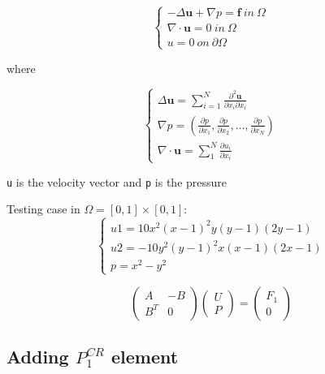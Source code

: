 \documentclass[11pt]{article}
\begin{document}
    \[
\left\{\begin{array}{l}
- \Delta\boldsymbol{u} + \nabla p = \boldsymbol{f} \ in \  \Omega \\
\nabla\cdot\boldsymbol{u} = 0 \ in \  \Omega \\
u = 0 \ on \ \partial \Omega
\end{array}\right.
\]

where

\[
\left\{\begin{array}{l}
\Delta \mathbf{u}=\sum_{i=1}^{N} \frac{\partial^{2} \mathbf{u}}{\partial x_{i} \partial x_{i}} \\
\nabla p=\left(\frac{\partial p}{\partial x_{1}}, \frac{\partial p}{\partial x_{2}}, \ldots, \frac{\partial p}{\partial x_{N}}\right) \\
\nabla \cdot \mathbf{u}=\sum_{1}^{N} \frac{\partial u_{i}}{\partial x_{i}}
\end{array}\right.
\]

\texttt{u} is the velocity vector and \texttt{p} is the pressure

    Testing case in \(\Omega=[0,1] \times [0,1]\): \[
\left\{\begin{array}{l}
u1 = 10x^{2}(x - 1)^{2}y(y - 1)(2y - 1) \\
u2 = -10y^{2}(y - 1)^{2}x(x - 1)(2x - 1) \\
p = x^{2} - y^{2}
\end{array}\right.
\]

    \[
\left(\begin{array}{cc}
A & -B \\
B^{T} & 0
\end{array}\right)\left(\begin{array}{l}
U \\
P
\end{array}\right)=\left(\begin{array}{l}
F_{1} \\
0
\end{array}\right)
\]

    \hypertarget{adding-p_1cr-element}{%
\subsection{\texorpdfstring{Adding \(P_{1}^{CR}\)
element}{Adding P\_\{1\}\^{}\{CR\} element}}\label{adding-p_1cr-element}}
\end{document}
